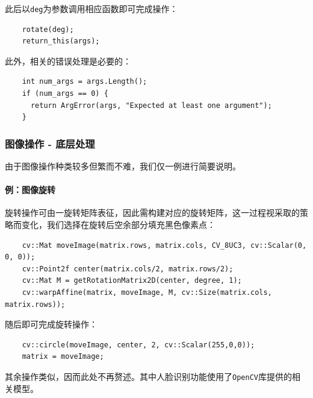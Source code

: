 \documentclass[a4paper,11pt,fontset=fandol]{article}
\begin{document}
此后以\texttt{deg}为参数调用相应函数即可完成操作：
\begin{verbatim}
    rotate(deg);
    return_this(args);
\end{verbatim}

此外，相关的错误处理是必要的：
\begin{verbatim}
    int num_args = args.Length();
    if (num_args == 0) {
      return ArgError(args, "Expected at least one argument");
    }
\end{verbatim}

\subsubsection{图像操作 - 底层处理}
由于图像操作种类较多但繁而不难，我们仅一例进行简要说明。

\paragraph{例：图像旋转}
旋转操作可由一旋转矩阵表征，因此需构建对应的旋转矩阵，这一过程视采取的策略而变化，我们选择在旋转后空余部分填充黑色像素点：
\begin{verbatim}
    cv::Mat moveImage(matrix.rows, matrix.cols, CV_8UC3, cv::Scalar(0, 0, 0));
    cv::Point2f center(matrix.cols/2, matrix.rows/2);
    cv::Mat M = getRotationMatrix2D(center, degree, 1);
    cv::warpAffine(matrix, moveImage, M, cv::Size(matrix.cols, matrix.rows));
\end{verbatim}

随后即可完成旋转操作：
\begin{verbatim}
    cv::circle(moveImage, center, 2, cv::Scalar(255,0,0));
    matrix = moveImage;
\end{verbatim}

其余操作类似，因而此处不再赘述。其中人脸识别功能使用了\texttt{OpenCV}库提供的相关模型。
\end{document}
